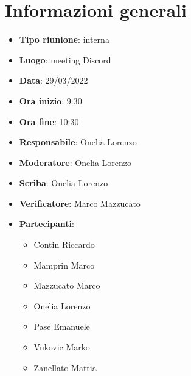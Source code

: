 \section{Informazioni generali}
\begin{itemize}
  \item \textbf{Tipo riunione}: interna
  \item \textbf{Luogo}: meeting Discord
  \item \textbf{Data}: 29/03/2022
  \item \textbf{Ora inizio}: 9:30
  \item \textbf{Ora fine}: 10:30
  \item \textbf{Responsabile}: Onelia Lorenzo
  \item \textbf{Moderatore}: Onelia Lorenzo
  \item \textbf{Scriba}: Onelia Lorenzo
  \item \textbf{Verificatore}: Marco Mazzucato
  \item \textbf{Partecipanti}:
  \begin{itemize}
    \item Contin Riccardo
    \item Mamprin Marco
    \item Mazzucato Marco
    \item Onelia Lorenzo
    \item Pase Emanuele
    \item Vukovic Marko
    \item Zanellato Mattia
  \end{itemize}
\end{itemize}
